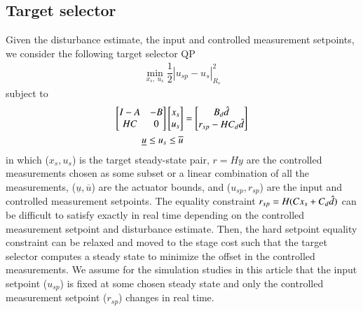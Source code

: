 \documentclass[preprint,5p, twocolumn, authoryear]{elsarticle}
\begin{document}
\subsection{Target selector}
Given the disturbance estimate, the
input and controlled measurement setpoints,
we consider the following target selector QP
\begin{align}
    \min_{x_s, \ u_s}  \dfrac{1}{2} |u_{sp} - u_s|^2_{R_s}
\end{align}
subject to
\begin{align}  
    \begin{bmatrix}
        I -A & -B \\
        HC & 0
    \end{bmatrix} \begin{bmatrix}
        x_s \\
        u_s
    \end{bmatrix} &= \begin{bmatrix}
        B_d\hat{d} \\
        r_{sp} - HC_d\hat{d}
    \end{bmatrix} \\
    \underline{u} \leq u_s \leq \overline{u}
\end{align}
in which
($x_s, u_s$) is the 
target steady-state pair,
$r=Hy$ are the controlled measurements
chosen as some subset 
or a linear combination of all the measurements,
($\underline{u}, \overline{u}$) are the 
actuator bounds, and
($u_{sp}, r_{sp}$) are the input and 
controlled measurement setpoints.
The equality constraint $r_{sp} = H(Cx_s + C_d\hat{d})$
can be difficult to satisfy exactly in real time 
depending on the controlled measurement setpoint 
and disturbance estimate. 
Then, the hard setpoint equality constraint 
can be relaxed and moved to the stage cost such 
that the target selector computes a steady state
to minimize the offset in the controlled measurements. 
We assume for the simulation studies
in this article that the input setpoint ($u_{sp}$)
is fixed at some chosen steady state and 
only the controlled measurement setpoint ($r_{sp}$) 
changes in real time.
\end{document}
